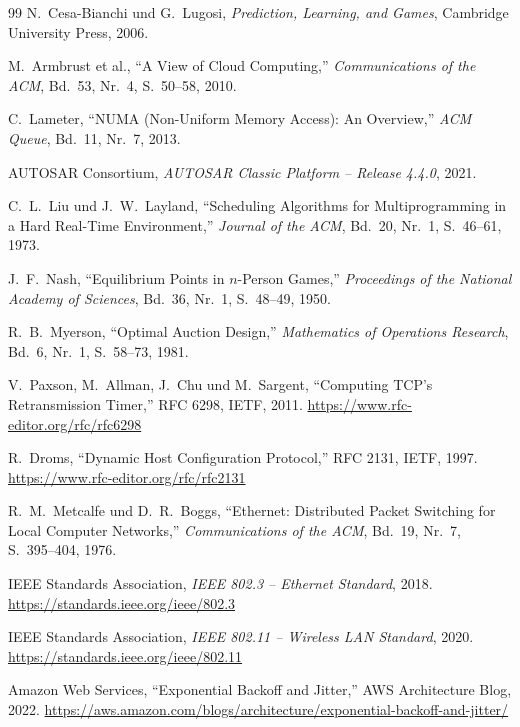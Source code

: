 ﻿\documentclass[a4paper,12pt]{article}
\theoremstyle{definition}
\begin{document}
\begin{thebibliography}{99}
  N.~Cesa-Bianchi und G.~Lugosi,
  \textit{Prediction, Learning, and Games},
  Cambridge University Press, 2006.

  M.~Armbrust et al.,
  ``A View of Cloud Computing,''
  \textit{Communications of the ACM},
  Bd.~53, Nr.~4, S.~50--58, 2010.

  C.~Lameter,
  ``NUMA (Non-Uniform Memory Access): An Overview,''
  \textit{ACM Queue}, Bd.~11, Nr.~7, 2013.

  AUTOSAR Consortium,
  \textit{AUTOSAR Classic Platform -- Release 4.4.0}, 2021.

  C.~L.~Liu und J.~W.~Layland,
  ``Scheduling Algorithms for Multiprogramming in a Hard Real-Time
  Environment,''
  \textit{Journal of the ACM},
  Bd.~20, Nr.~1, S.~46--61, 1973.

  J.~F.~Nash,
  ``Equilibrium Points in $n$-Person Games,''
  \textit{Proceedings of the National Academy of Sciences},
  Bd.~36, Nr.~1, S.~48--49, 1950.

  R.~B.~Myerson,
  ``Optimal Auction Design,''
  \textit{Mathematics of Operations Research},
  Bd.~6, Nr.~1, S.~58--73, 1981.

  V.~Paxson, M.~Allman, J.~Chu und M.~Sargent,
  ``Computing TCP's Retransmission Timer,''
  RFC 6298, IETF, 2011.
  \url{https://www.rfc-editor.org/rfc/rfc6298}

  R.~Droms,
  ``Dynamic Host Configuration Protocol,''
  RFC 2131, IETF, 1997.
  \url{https://www.rfc-editor.org/rfc/rfc2131}

  R.~M.~Metcalfe und D.~R.~Boggs,
  ``Ethernet: Distributed Packet Switching for Local Computer Networks,''
  \textit{Communications of the ACM},
  Bd.~19, Nr.~7, S.~395--404, 1976.

  IEEE Standards Association,
  \textit{IEEE 802.3 -- Ethernet Standard},
  2018.
  \url{https://standards.ieee.org/ieee/802.3}

  IEEE Standards Association,
  \textit{IEEE 802.11 -- Wireless LAN Standard},
  2020.
  \url{https://standards.ieee.org/ieee/802.11}

  Amazon Web Services,
  ``Exponential Backoff and Jitter,''
  AWS Architecture Blog, 2022.
  \url{https://aws.amazon.com/blogs/architecture/exponential-backoff-and-jitter/}


\end{thebibliography}
\end{document}

